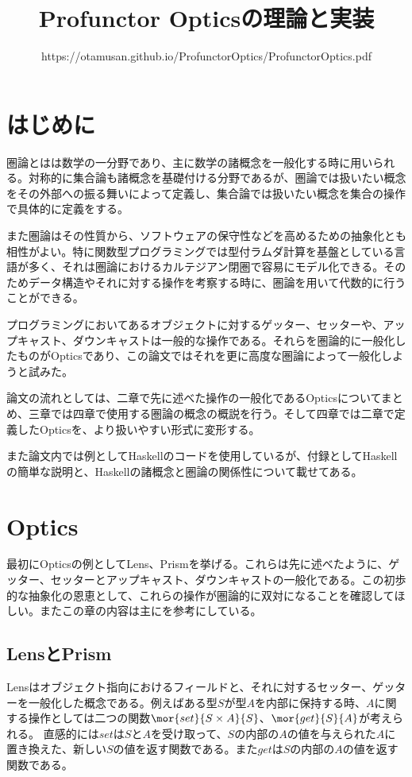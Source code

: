 \documentclass[uplatex,dvipdfmx]{jsarticle}
\begin{document}
  \title{Profunctor Opticsの理論と実装}
  \author{https://otamusan.github.io/ProfunctorOptics/ProfunctorOptics.pdf}
  \maketitle

	\tableofcontents
  \pagebreak
  \section{はじめに}
  圏論とはは数学の一分野であり、主に数学の諸概念を一般化する時に用いられる。対称的に集合論も諸概念を基礎付ける分野であるが、圏論では扱いたい概念をその外部への振る舞いによって定義し、集合論では扱いたい概念を集合の操作で具体的に定義をする。

  また圏論はその性質から、ソフトウェアの保守性などを高めるための抽象化とも相性がよい。特に関数型プログラミングでは型付ラムダ計算を基盤としている言語が多く、それは圏論におけるカルテジアン閉圏で容易にモデル化できる。そのためデータ構造やそれに対する操作を考察する時に、圏論を用いて代数的に行うことができる。

  プログラミングにおいてあるオブジェクトに対するゲッター、セッターや、アップキャスト、ダウンキャストは一般的な操作である。それらを圏論的に一般化したものがOpticsであり、この論文ではそれを更に高度な圏論によって一般化しようと試みた。

  論文の流れとしては、二章で先に述べた操作の一般化であるOpticsについてまとめ、三章では四章で使用する圏論の概念の概説を行う。そして四章では二章で定義したOpticsを、より扱いやすい形式に変形する。

  また論文内では例としてHaskellのコードを使用しているが、付録としてHaskellの簡単な説明と、Haskellの諸概念と圏論の関係性について載せてある。
  \section{Optics}
  最初にOpticsの例としてLens、Prismを挙げる。これらは先に述べたように、ゲッター、セッターとアップキャスト、ダウンキャストの一般化である。この初歩的な抽象化の恩恵として、これらの操作が圏論的に双対になることを確認してほしい。またこの章の内容は主に\cite{categories_of_optics}を参考にしている。

  \subsection{LensとPrism}
  Lensはオブジェクト指向におけるフィールドと、それに対するセッター、ゲッターを一般化した概念である。例えばある型$S$が型$A$を内部に保持する時、$A$に関する操作としては二つの関数$\mor{set}{S\times A}{S}$、$\mor{get}{S}{A}$が考えられる。
  直感的には$set$は$S$と$A$を受け取って、$S$の内部の$A$の値を与えられた$A$に置き換えた、新しい$S$の値を返す関数である。また$get$は$S$の内部の$A$の値を返す関数である。
  
\end{document}

